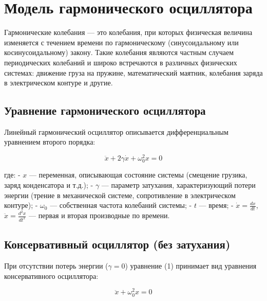 \documentclass[
  12pt,
  a4paper,
  DIV=11,
  numbers=noendperiod]{scrreprt}
\begin{document}
\section{Модель гармонического
осциллятора}\label{ux43cux43eux434ux435ux43bux44c-ux433ux430ux440ux43cux43eux43dux438ux447ux435ux441ux43aux43eux433ux43e-ux43eux441ux446ux438ux43bux43bux44fux442ux43eux440ux430}

Гармонические колебания --- это колебания, при которых физическая
величина изменяется с течением времени по гармоническому
(синусоидальному или косинусоидальному) закону. Такие колебания являются
частным случаем периодических колебаний и широко встречаются в различных
физических системах: движение груза на пружине, математический маятник,
колебания заряда в электрическом контуре и другие.

\subsection{Уравнение гармонического
осциллятора}\label{ux443ux440ux430ux432ux43dux435ux43dux438ux435-ux433ux430ux440ux43cux43eux43dux438ux447ux435ux441ux43aux43eux433ux43e-ux43eux441ux446ux438ux43bux43bux44fux442ux43eux440ux430}

Линейный гармонический осциллятор описывается дифференциальным
уравнением второго порядка:

\[
\ddot{x} + 2\gamma \dot{x} + \omega_0^2 x = 0 \tag{1}
\]

где: - \(x\) --- переменная, описывающая состояние системы (смещение
грузика, заряд конденсатора и т.д.); - \(\gamma\) --- параметр
затухания, характеризующий потери энергии (трение в механической
системе, сопротивление в электрическом контуре); - \(\omega_0\) ---
собственная частота колебаний системы; - \(t\) --- время; -
\(\dot{x} = \frac{dx}{dt}\), \(\ddot{x} = \frac{d^2x}{dt^2}\) --- первая
и вторая производные по времени.

\subsection{Консервативный осциллятор (без
затухания)}\label{ux43aux43eux43dux441ux435ux440ux432ux430ux442ux438ux432ux43dux44bux439-ux43eux441ux446ux438ux43bux43bux44fux442ux43eux440-ux431ux435ux437-ux437ux430ux442ux443ux445ux430ux43dux438ux44f}

При отсутствии потерь энергии (\(\gamma = 0\)) уравнение (1) принимает
вид уравнения консервативного осциллятора:

\[
\ddot{x} + \omega_0^2 x = 0 \tag{2}
\]
\end{document}
